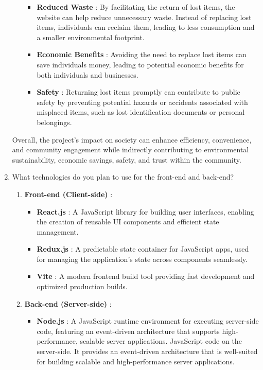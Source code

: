 \documentclass[14pt]{article}
\begin{document}
\begin{enumerate}
\begin{enumerate}
\begin{itemize}
\item \textbf{Reduced Waste} : By facilitating the return of lost items, the website can
help reduce unnecessary waste. Instead of replacing lost items, individuals can reclaim them, leading to less consumption and a smaller environmental
footprint.
\item \textbf{Economic Benefits} : Avoiding the need to replace lost items can save
individuals money, leading to potential economic benefits for both
individuals and businesses.
\item \textbf{Safety} : Returning lost items promptly can contribute to public safety by
preventing potential hazards or accidents associated with misplaced items, such as lost identification documents or personal belongings.
\end{itemize}
\end{enumerate}
\tabto{.5cm} Overall, the project's impact on society can enhance efficiency, convenience, and
community engagement while indirectly contributing to environmental sustainability, economic savings, safety, and trust within the community.
\item What technologies do you plan to use for the front-end and back-end?
\begin{enumerate}
\item \textbf{Front-end (Client-side)} :
\begin{itemize}
\item \textbf{React.js} : A JavaScript library for building user interfaces, enabling the creation of reusable UI components and efficient state management.
\item \textbf{Redux.js} : A predictable state container for JavaScript apps, used for managing the application’s state across components seamlessly.
\item \textbf{Vite} : A modern frontend build tool providing fast development and optimized production builds.
\end{itemize}
\item \textbf{Back-end (Server-side)} :
\begin{itemize}
\item \textbf{Node.js} : A JavaScript runtime environment for executing server-side code, featuring an event-driven architecture that supports high-performance, scalable server applications.
 JavaScript code on the server-side. It provides an event-driven architecture that is well-suited for building scalable and high-performance server applications.

\end{itemize}
\end{enumerate}
\end{enumerate}
\end{document}

